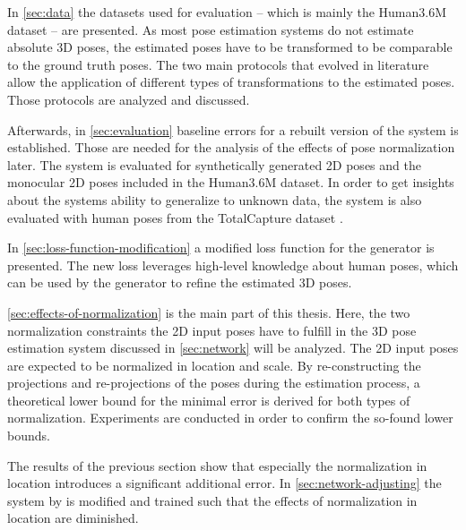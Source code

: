 In \autoref{sec:data} the datasets used for evaluation -- which is mainly the Human3.6M dataset \cite{ionescu14} -- are presented.
As most pose estimation systems do not estimate absolute 3D poses, the estimated poses have to be transformed to be comparable to the ground truth poses.
The two main protocols that evolved in literature allow the application of different types of transformations to the estimated poses.
Those protocols are analyzed and discussed.

Afterwards, in \autoref{sec:evaluation} baseline errors for a rebuilt version of the system is established.
Those are needed for the analysis of the effects of pose normalization later.
The system is evaluated for synthetically generated 2D poses and the monocular 2D poses included in the Human3.6M dataset.
In order to get insights about the systems ability to generalize to unknown data, the system is also evaluated with human poses from the TotalCapture dataset \cite{trumble17}.

In \autoref{sec:loss-function-modification} a modified loss function for the generator is presented.
The new loss leverages high-level knowledge about human poses, which can be used by the generator to refine the estimated 3D poses.

\autoref{sec:effects-of-normalization} is the main part of this thesis.
Here, the two normalization constraints the 2D input poses have to fulfill in the 3D pose estimation system discussed in \autoref{sec:network} will be analyzed.
The 2D input poses are expected to be normalized in location and scale.
By re-constructing the projections and re-projections of the poses during the estimation process, a theoretical lower bound for the minimal error is derived for both types of normalization.
Experiments are conducted in order to confirm the so-found lower bounds.

The results of the previous section show that especially the normalization in location introduces a significant additional error.
In \autoref{sec:network-adjusting} the system by \citet{drover18} is modified and trained such that the effects of normalization in location are diminished.
